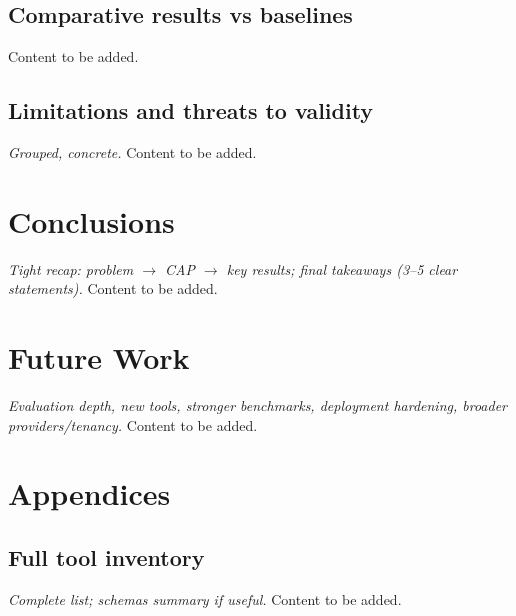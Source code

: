 \documentclass[a4paper,twoside]{sapthesis}
\begin{document}
\section{Comparative results vs baselines}
\label{sec:comparative-results}
Content to be added.

\section{Limitations and threats to validity}
\label{sec:limitations}
\emph{Grouped, concrete.} Content to be added.


\chapter{Conclusions}
\label{ch:conclusions}
\emph{Tight recap: problem $\to$ CAP $\to$ key results; final takeaways (3–5 clear statements).} Content to be added.


\chapter{Future Work}
\label{ch:future-work}
\emph{Evaluation depth, new tools, stronger benchmarks, deployment hardening, broader providers/tenancy.} Content to be added.


\appendix

\chapter*{Appendices}
\label{ch:appendix}
\renewcommand{\thesection}{\Alph{section}}
\setcounter{section}{0}

\section{Full tool inventory}
\label{app:tool-inventory}
\emph{Complete list; schemas summary if useful.} Content to be added.
\end{document}
